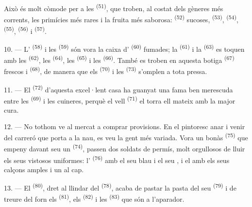 Això és molt còmode per a les  \textsuperscript{(51)}, que troben, al costat
dels gèneres més corrents, les primícies més rares i la fruita més saborosa: 
\textsuperscript{(52)} sucoses,  \textsuperscript{(53)}, 
\textsuperscript{(54)},
 \textsuperscript{(55)}, 
\textsuperscript{(56)} i  \textsuperscript{(57)}.

\VUsaut{4.0mm}
\VUsaut{3.0mm}

10. --- L' \textsuperscript{(58)} i les  \textsuperscript{(59)}
són vora la caixa d' \textsuperscript{(60)} fumades; la 
\textsuperscript{(61)} i la
 \textsuperscript{(63)} es toquen amb les 
\textsuperscript{(62)}, les  \textsuperscript{(64)}, les
 \textsuperscript{(65)} i les 
\textsuperscript{(66)}. També es troben en aquesta botiga  \textsuperscript{(67)}
frescos i  \textsuperscript{(68)}, de manera que els 
\textsuperscript{(70)} i les  \textsuperscript{(73)} s'omplen a
tota pressa.

11. --- El  \textsuperscript{(72)} d'aquesta excel·lent casa ha guanyat una fama
ben merescuda entre les  \textsuperscript{(69)} i les cuineres, perquè el vell
 \textsuperscript{(71)} el torra ell mateix amb la major cura.

\VUsaut{4.0mm}
\VUsaut{3.0mm}

12. --- No tothom ve al mercat a comprar provisions. En el pintoresc anar i venir del carreró
que porta a la nau, es veu la gent més variada. Vora un bonàs
 \textsuperscript{(75)} que empeny davant seu un
 \textsuperscript{(74)}, passen dos soldats de permís, molt
orgullosos de lluir els seus vistosos uniformes: l' \textsuperscript{(76)} amb
el seu  blau i el seu , i el 
amb els seus calçons amples i un
 al cap.

13. --- El  \textsuperscript{(80)}, dret al llindar del
 \textsuperscript{(78)}, acaba de pastar la pasta del seu 
\textsuperscript{(79)} i de treure del forn els  \textsuperscript{(81)},
els  \textsuperscript{(82)} i les
 \textsuperscript{(83)} que són a l'aparador.

